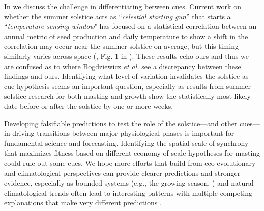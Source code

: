 \documentclass[11pt,letter]{article}
\begin{document}
In \citep{VanderMeersch2025} we discuss the challenge in differentiating between cues. Current work on whether the summer solstice acts as ``\emph{celestial starting gun}'' that starts a ``\emph{temperature-sensing window}" has focused on a statistical correlation between an annual metric of seed production and daily temperature to show a shift in the correlation may occur near the summer solstice on average, but this timing similarly varies across space (\citep{Journe2024}, Fig. 1 in \citep{Bogdziewiczresponse}). These results echo ours \citep{VanderMeersch2025} and thus we are confused as to where Bogdziewicz \emph{et al.} see a discrepancy between these findings and ours. Identifying what level of variation invalidates the solstice-as-cue hypothesis seems an important question, especially as results from summer solstice research for both masting \citep{Journe2024,Bogdziewiczresponse} and growth \citep{Zohner2023} show the statistically most likely date before or after the solstice by one or more weeks. 

Developing falsifiable predictions to test the role of the solstice---and other cues---in driving transitions between major physiological phases is important for fundamental science and forecasting. Identifying the spatial scale of synchrony that maximizes fitness based on different economy of scale hypotheses for masting \citep{Davies2024} could rule out some cues. We hope more efforts that build from eco-evolutionary and climatological perspectives \citep{VanderMeersch2025} can provide clearer predictions and stronger evidence, especially as bounded systems (e.g., the growing season, \citep{Colwell2000, Morales2005}) and natural climatological trends often lead to interesting patterns with multiple competing explanations that make very different predictions \citep{Gao2024,decsens}. 

\clearpage


\end{document}
